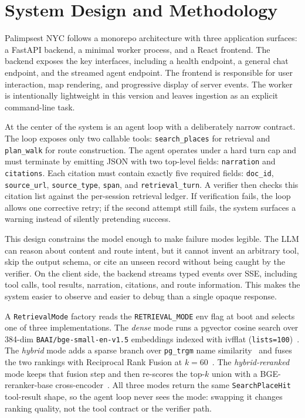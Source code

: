 \documentclass[sigconf,nonacm]{acmart}
\begin{document}
\section{System Design and Methodology}
Palimpsest NYC follows a monorepo architecture with three application surfaces: a FastAPI backend, a minimal worker process, and a React frontend. The backend exposes the key interfaces, including a health endpoint, a general chat endpoint, and the streamed agent endpoint. The frontend is responsible for user interaction, map rendering, and progressive display of server events. The worker is intentionally lightweight in this version and leaves ingestion as an explicit command-line task.

At the center of the system is an agent loop with a deliberately narrow contract. The loop exposes only two callable tools: \texttt{search\_places} for retrieval and \texttt{plan\_walk} for route construction. The agent operates under a hard turn cap and must terminate by emitting JSON with two top-level fields: \texttt{narration} and \texttt{citations}. Each citation must contain exactly five required fields: \texttt{doc\_id}, \texttt{source\_url}, \texttt{source\_type}, \texttt{span}, and \texttt{retrieval\_turn}. A verifier then checks this citation list against the per-session retrieval ledger. If verification fails, the loop allows one corrective retry; if the second attempt still fails, the system surfaces a warning instead of silently pretending success.

This design constrains the model enough to make failure modes legible. The LLM can reason about content and route intent, but it cannot invent an arbitrary tool, skip the output schema, or cite an unseen record without being caught by the verifier. On the client side, the backend streams typed events over SSE, including tool calls, tool results, narration, citations, and route information. This makes the system easier to observe and easier to debug than a single opaque response.

A \texttt{RetrievalMode} factory reads the \texttt{RETRIEVAL\_MODE} env flag at boot and selects one of three implementations. The \emph{dense} mode runs a pgvector cosine search over 384-dim \texttt{BAAI/bge-small-en-v1.5} embeddings indexed with ivfflat (\texttt{lists=100})~\cite{bge}. The \emph{hybrid} mode adds a sparse branch over \texttt{pg\_trgm} name similarity~\cite{pgtrgm} and fuses the two rankings with Reciprocal Rank Fusion at \(k=60\)~\cite{rrf}. The \emph{hybrid-reranked} mode keeps that fusion step and then re-scores the top-\(k\) union with a BGE-reranker-base cross-encoder~\cite{bgereranker}. All three modes return the same \texttt{SearchPlaceHit} tool-result shape, so the agent loop never sees the mode: swapping it changes ranking quality, not the tool contract or the verifier path.
\end{document}

